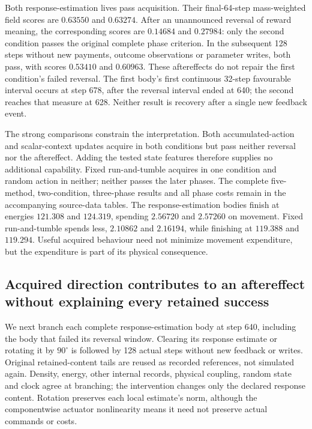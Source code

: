 Both response-estimation lives pass acquisition. Their final-64-step mass-weighted field scores are $0.63550$ and $0.63274$. After an unannounced reversal of reward meaning, the corresponding scores are $0.14684$ and $0.27984$: only the second condition passes the original complete phase criterion. In the subsequent 128 steps without new payments, outcome observations or parameter writes, both pass, with scores $0.53410$ and $0.60963$. These aftereffects do not repair the first condition's failed reversal. The first body's first continuous 32-step favourable interval occurs at step 678, after the reversal interval ended at 640; the second reaches that measure at 628. Neither result is recovery after a single new feedback event.

The strong comparisons constrain the interpretation. Both accumulated-action and scalar-context updates acquire in both conditions but pass neither reversal nor the aftereffect. Adding the tested state features therefore supplies no additional capability. Fixed run-and-tumble acquires in one condition and random action in neither; neither passes the later phases. The complete five-method, two-condition, three-phase results and all phase costs remain in the accompanying source-data tables. The response-estimation bodies finish at energies $121.308$ and $124.319$, spending $2.56720$ and $2.57260$ on movement. Fixed run-and-tumble spends less, $2.10862$ and $2.16194$, while finishing at $119.388$ and $119.294$. Useful acquired behaviour need not minimize movement expenditure, but the expenditure is part of its physical consequence.

\subsection*{Acquired direction contributes to an aftereffect without explaining every retained success}

We next branch each complete response-estimation body at step 640, including the body that failed its reversal window. Clearing its response estimate or rotating it by $90^\circ$ is followed by 128 actual steps without new feedback or writes. Original retained-content tails are reused as recorded references, not simulated again. Density, energy, other internal records, physical coupling, random state and clock agree at branching; the intervention changes only the declared response content. Rotation preserves each local estimate's norm, although the componentwise actuator nonlinearity means it need not preserve actual commands or costs.

